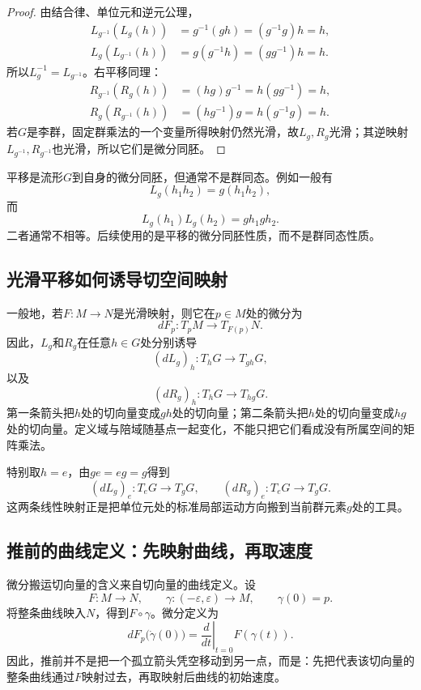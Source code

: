 \begin{proof}
由结合律、单位元和逆元公理，
\[
\begin{aligned}
    L_{g^{-1}}(L_g(h))
    &=g^{-1}(gh)=(g^{-1}g)h=h,\\
    L_g(L_{g^{-1}}(h))
    &=g(g^{-1}h)=(gg^{-1})h=h.
\end{aligned}
\]
所以$L_g^{-1}=L_{g^{-1}}$。右平移同理：
\[
\begin{aligned}
    R_{g^{-1}}(R_g(h))
    &=(hg)g^{-1}=h(gg^{-1})=h,\\
    R_g(R_{g^{-1}}(h))
    &=(hg^{-1})g=h(g^{-1}g)=h.
\end{aligned}
\]
若$G$是李群，固定群乘法的一个变量所得映射仍然光滑，故$L_g,R_g$光滑；其逆映射$L_{g^{-1}},R_{g^{-1}}$也光滑，所以它们是微分同胚。
\end{proof}

\begin{remark}
平移是流形$G$到自身的微分同胚，但通常不是群同态。例如一般有
\[
    L_g(h_1h_2)=g(h_1h_2),
\]
而
\[
    L_g(h_1)L_g(h_2)=gh_1gh_2.
\]
二者通常不相等。后续使用的是平移的微分同胚性质，而不是群同态性质。
\end{remark}

\subsection{光滑平移如何诱导切空间映射}

一般地，若$F:M\to N$是光滑映射，则它在$p\in M$处的微分为
\[
    dF_p:T_pM\to T_{F(p)}N.
\]
因此，$L_g$和$R_g$在任意$h\in G$处分别诱导
\[
    \boxed{
    (dL_g)_h:T_hG\to T_{gh}G,
    }
\]
以及
\[
    \boxed{
    (dR_g)_h:T_hG\to T_{hg}G.
    }
\]
第一条箭头把$h$处的切向量变成$gh$处的切向量；第二条箭头把$h$处的切向量变成$hg$处的切向量。定义域与陪域随基点一起变化，不能只把它们看成没有所属空间的矩阵乘法。

特别取$h=e$，由$ge=eg=g$得到
\[
    \boxed{
    (dL_g)_e:T_eG\to T_gG,
    \qquad
    (dR_g)_e:T_eG\to T_gG.
    }
\]
这两条线性映射正是把单位元处的标准局部运动方向搬到当前群元素$g$处的工具。

\subsection{推前的曲线定义：先映射曲线，再取速度}

微分搬运切向量的含义来自切向量的曲线定义。设
\[
    F:M\to N,
    \qquad
    \gamma:(-\varepsilon,\varepsilon)\to M,
    \qquad
    \gamma(0)=p.
\]
将整条曲线映入$N$，得到$F\circ\gamma$。微分定义为
\[
    \boxed{
    dF_p\bigl(\dot\gamma(0)\bigr)
    =\left.\frac{d}{dt}\right|_{t=0}
    F(\gamma(t)).
    }
\]
因此，推前并不是把一个孤立箭头凭空移动到另一点，而是：先把代表该切向量的整条曲线通过$F$映射过去，再取映射后曲线的初始速度。


